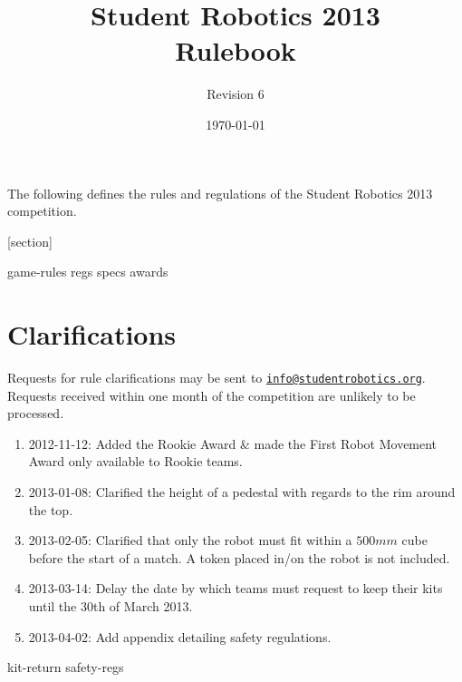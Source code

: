 \documentclass[a4paper, 11pt]{scrartcl}
\title {Student Robotics 2013\\ Rulebook}
\author{Revision 6}
\date{\today}
\begin{document}
\maketitle

\noindent The following defines the rules and regulations of the Student Robotics 2013 competition.

[section]
\newcommand{\rcn}{\stepcounter{rule}\arabic{section}.\arabic{rule}}
\renewcommand{\labelenumi}{\rcn}

 {game-rules}
\newpage
 {regs}
\newpage
 {specs}
\newpage
 {awards}

\renewcommand{\labelenumi}{\rcn}

\section{Clarifications}
Requests for rule clarifications may be sent to \href{mailto:info@studentrobotics.org}{\nolinkurl{info@studentrobotics.org}}.
Requests received within one month of the competition are unlikely to be processed.


\begin{enumerate}
\item 2012-11-12: Added the Rookie Award \& made the First Robot Movement Award only available to Rookie teams.
\item 2013-01-08: Clarified the height of a pedestal with regards to the rim around the top.
\item 2013-02-05: Clarified that only the robot must fit within a $500mm$ cube before the start of a match. A token placed in/on the robot is not included.
\item 2013-03-14: Delay the date by which teams must request to keep their kits until the 30th of March 2013.
\item 2013-04-02: Add appendix detailing safety regulations.
\end{enumerate}

\newpage
\appendix
\appendixpage
\addappheadtotoc
 {kit-return}
 {safety-regs}
\end{document}
